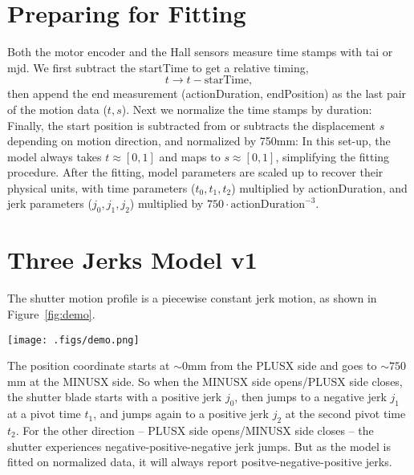 \documentclass[OPS,lsstdraft,authoryear,toc]{lsstdoc}
\begin{document}
\section{Preparing for Fitting}
Both the motor encoder and the Hall sensors measure time stamps with tai or mjd.  We first subtract the startTime to get a relative timing,
\begin{equation}
    t \to t - \mathrm{starTime},
\end{equation}
then append the end measurement (actionDuration, endPosition) as the last pair of the motion data ($t, s$). Next we normalize the time stamps by duration:
Finally, the start position is subtracted from or subtracts the displacement $s$ depending on motion direction, and normalized by 750mm:
In this set-up, the model always takes $t \approx [0,1]$ and maps to $s \approx [0,1]$, simplifying the fitting procedure. After the fitting, model parameters are scaled up to recover their physical units, with time parameters ($t_0, t_1, t_2$) multiplied by actionDuration, and jerk parameters ($j_0, j_1, j_2$) multiplied by $750 \cdot \mathrm{actionDuration}^{-3}$.

\section{Three Jerks Model v1}
The shutter motion profile is a piecewise constant jerk motion, as shown in Figure~\ref{fig:demo}. 
\begin{figure*}
	\centering
        \texttt{[image: .figs/demo.png]}
	\label{fig:demo}
    \caption{An example of a shutter motion profile. The plots show fitted jerk, acceleration, velocity and displacement respectively, of the  MINUSX-side blade open/PLUSX-side blade close. Motor encoder and Hall sensor measurements of the profile are also shown in the last panel.}
\end{figure*}
The position coordinate starts at $\sim0$mm from the PLUSX side and goes to $\sim750$mm at the MINUSX side. So when the MINUSX side opens/PLUSX side closes,  the shutter blade starts with a positive jerk $j_0$, then jumps to a negative jerk $j_1$ at a pivot time $t_1$, and jumps again to a positive jerk $j_2$ at the second pivot time $t_2$. For the other direction -- PLUSX side opens/MINUSX side closes -- the shutter experiences negative-positive-negative jerk jumps. But as the model is fitted on normalized data, it will always report positve-negative-positive jerks.
\end{document}
